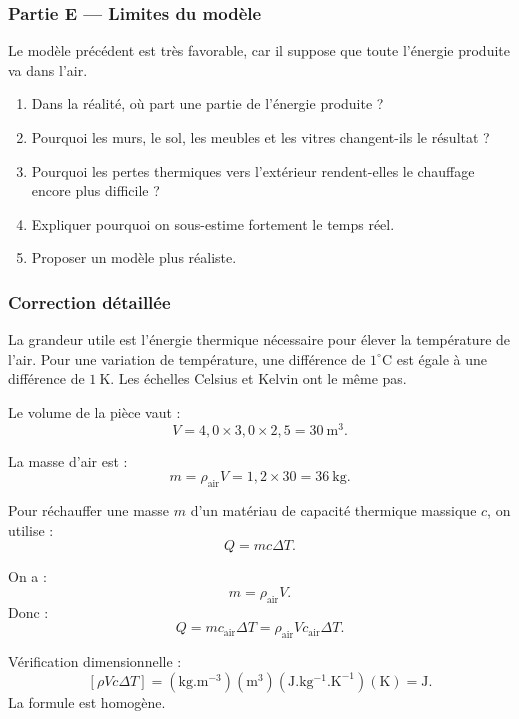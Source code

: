 \documentclass[11pt,a4paper]{article}
\begin{document}
\subsubsection*{Partie E — Limites du modèle}

Le modèle précédent est très favorable, car il suppose que toute l'énergie produite va dans l'air.

\begin{enumerate}
  \item Dans la réalité, où part une partie de l'énergie produite ?
  \item Pourquoi les murs, le sol, les meubles et les vitres changent-ils le résultat ?
  \item Pourquoi les pertes thermiques vers l'extérieur rendent-elles le chauffage encore plus difficile ?
  \item Expliquer pourquoi on sous-estime fortement le temps réel.
  \item Proposer un modèle plus réaliste.
\end{enumerate}

\subsubsection*{Correction détaillée}

\begin{corrigebox}
La grandeur utile est l'énergie thermique nécessaire pour élever la température de l'air. Pour une variation de température, une différence de \(1^\circ\mathrm C\) est égale à une différence de \(1\ \mathrm K\). Les échelles Celsius et Kelvin ont le même pas.

Le volume de la pièce vaut :
\[
V=4{,}0\times3{,}0\times2{,}5=30\ \mathrm{m^3}.
\]

La masse d'air est :
\[
m=\rho_{\mathrm{air}}V=1{,}2\times30=36\ \mathrm{kg}.
\]

Pour réchauffer une masse \(m\) d'un matériau de capacité thermique massique \(c\), on utilise :
\[
Q=mc\Delta T.
\]
\end{corrigebox}

\begin{corrigebox}
On a :
\[
m=\rho_{\mathrm{air}}V.
\]
Donc :
\[
Q=mc_{\mathrm{air}}\Delta T
=\rho_{\mathrm{air}}Vc_{\mathrm{air}}\Delta T.
\]

Vérification dimensionnelle :
\[
[\rho V c\Delta T]
=
\left(\mathrm{kg.m^{-3}}\right)
\left(\mathrm{m^3}\right)
\left(\mathrm{J.kg^{-1}.K^{-1}}\right)
\left(\mathrm K\right)
=\mathrm J.
\]
La formule est homogène.
\end{corrigebox}
\end{document}
